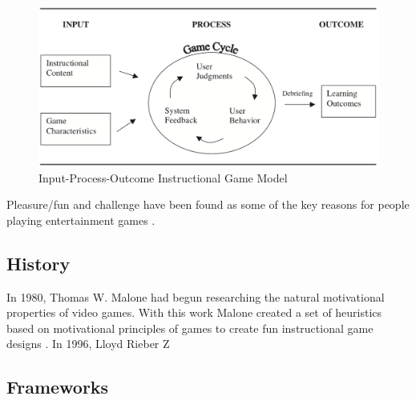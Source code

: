 \documentclass[a4paper,11.5pt]{report}
\numberwithin{figure}{section}
\numberwithin{table}{section}
\numberwithin{equation}{section}
\numberwithin{equation}{section}
\begin{document}
\begin{figure}[H]
 \centering
    \includegraphics[width=1\textwidth]{Inputprocessoutcomegamemodel}
       \captionsetup{justification=centering}
\caption{Input-Process-Outcome Instructional Game Model  {\citep{Driskell2002}}}
\label{fig:Input_process_outcome_game_model}
\end{figure}


Pleasure/fun and challenge have been found as some of the key reasons for people playing entertainment games \citep{Connolly2012}.


\subsection{History}

In 1980, Thomas W. Malone had begun researching the natural motivational properties of video games. With this work Malone created a set of heuristics based on motivational principles of games to create fun instructional game designs \citep{Malone1987}.  In 1996, Lloyd Rieber Z



\subsection{Frameworks}
\end{document}
